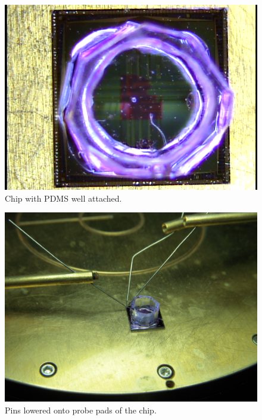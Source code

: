 \begin{figure}
	\centering
	\includegraphics[width=\linewidth]{figures/chip-top.png}
	\caption{Chip with PDMS well attached.}
	\label{chip-top}
\end{figure}

\begin{figure}
	\centering
	\includegraphics[width=\linewidth]{figures/chippins.png}
	\caption{Pins lowered onto probe pads of the chip.}
	\label{chippins}
\end{figure}

